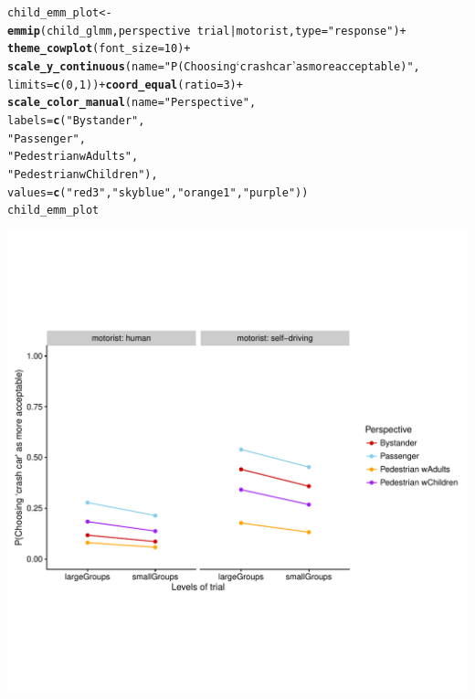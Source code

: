 \documentclass{scrartcl}\usepackage[]{graphicx}\usepackage[]{color}
\makeatletter
\def\maxwidth{ %
  \ifdim\Gin@nat@width>\linewidth
    \linewidth
  \else
    \Gin@nat@width
  \fi
}
\newcommand{\hlnum}[1]{\textcolor[rgb]{0.686,0.059,0.569}{#1}}%
\newcommand{\hlstr}[1]{\textcolor[rgb]{0.192,0.494,0.8}{#1}}%
\newcommand{\hlopt}[1]{\textcolor[rgb]{0,0,0}{#1}}%
\newcommand{\hlstd}[1]{\textcolor[rgb]{0.345,0.345,0.345}{#1}}%
\newcommand{\hlkwb}[1]{\textcolor[rgb]{0.69,0.353,0.396}{#1}}%
\newcommand{\hlkwc}[1]{\textcolor[rgb]{0.333,0.667,0.333}{#1}}%
\newcommand{\hlkwd}[1]{\textcolor[rgb]{0.737,0.353,0.396}{\textbf{#1}}}%
\newenvironment{kframe}{%
 \def\at@end@of@kframe{}%
 \ifinner\ifhmode%
  \def\at@end@of@kframe{\end{minipage}}%
  \begin{minipage}{\columnwidth}%
 \fi\fi%
 \def\FrameCommand##1{\hskip\@totalleftmargin \hskip-\fboxsep
 \colorbox{shadecolor}{##1}\hskip-\fboxsep
     \hskip-\linewidth \hskip-\@totalleftmargin \hskip\columnwidth}%
 \MakeFramed {\advance\hsize-\width
   \@totalleftmargin\z@ \linewidth\hsize
   \@setminipage}}%
 {\par\unskip\endMakeFramed%
 \at@end@of@kframe}
\newenvironment{knitrout}{}{} %
\makeatother
\begin{document}
\begin{knitrout}
\color{fgcolor}\begin{kframe}
\begin{alltt}
\hlstd{child_emm_plot} \hlkwb{<-} \hlkwd{emmip}\hlstd{(child_glmm, perspective} \hlopt{~} \hlstd{trial} \hlopt{|} \hlstd{motorist,} \hlkwc{type} \hlstd{=} \hlstr{"response"}\hlstd{)} \hlopt{+}
    \hlkwd{theme_cowplot}\hlstd{(}\hlkwc{font_size} \hlstd{=} \hlnum{10}\hlstd{)} \hlopt{+}
    \hlkwd{scale_y_continuous}\hlstd{(}\hlkwc{name} \hlstd{=} \hlstr{"P(Choosing `crash car' as more acceptable)"}\hlstd{,}
                       \hlkwc{limits} \hlstd{=} \hlkwd{c}\hlstd{(}\hlnum{0}\hlstd{,} \hlnum{1}\hlstd{))} \hlopt{+} \hlkwd{coord_equal}\hlstd{(}\hlkwc{ratio} \hlstd{=} \hlnum{3}\hlstd{)} \hlopt{+}
    \hlkwd{scale_color_manual}\hlstd{(}\hlkwc{name} \hlstd{=} \hlstr{"Perspective"}\hlstd{,}
                       \hlkwc{labels} \hlstd{=} \hlkwd{c}\hlstd{(}\hlstr{"Bystander"}\hlstd{,}
                                  \hlstr{"Passenger"}\hlstd{,}
                                  \hlstr{"Pedestrian wAdults"}\hlstd{,}
                                  \hlstr{"Pedestrian wChildren"}\hlstd{),}
                       \hlkwc{values} \hlstd{=} \hlkwd{c}\hlstd{(}\hlstr{"red3"}\hlstd{,} \hlstr{"skyblue"}\hlstd{,} \hlstr{"orange1"}\hlstd{,} \hlstr{"purple"}\hlstd{))}
\hlstd{child_emm_plot}
\end{alltt}
\end{kframe}
\includegraphics[width=\maxwidth]{figure/child-emm-plot-1} 

\end{knitrout}
\end{document}
